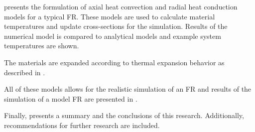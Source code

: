    presents the formulation of axial heat convection
  and radial heat conduction models for a typical FR. These models are used to
  calculate material temperatures and update cross-sections for the simulation.
  Results of the numerical model is compared to analytical models and example
  system temperatures are shown.

  The materials are expanded according to thermal expansion behavior as
  described in . 
  
  All of these models allows for the realistic
  simulation of an FR and results of the simulation of a model FR are presented
  in .
 
  Finally,  presents a 
  summary and the conclusions of this research. Additionally, recommendations 
  for further research are included.

